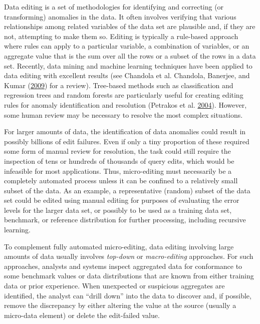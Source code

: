 \documentclass[]{krantz}
\begin{document}
Data editing is a set of methodologies for identifying and correcting
(or transforming) anomalies in the data. It often involves verifying
that various relationships among related variables of the data set are
plausible and, if they are not, attempting to make them so. Editing is
typically a rule-based approach where rules can apply to a particular
variable, a combination of variables, or an aggregate value that is the
sum over all the rows or a subset of the rows in a data set. Recently,
data mining and machine learning techniques have been applied to data
editing with excellent results (see Chandola et al. Chandola, Banerjee,
and Kumar (\protect\hyperlink{ref-chandola2009anomaly}{2009}) for a
review). Tree-based methods such as classification and regression trees
and random forests are particularly useful for creating editing rules
for anomaly identification and resolution (Petrakos et al.
\protect\hyperlink{ref-petrakos2004new}{2004}). However, some human
review may be necessary to resolve the most complex situations.

For larger amounts of data, the identification of data anomalies could
result in possibly billions of edit failures. Even if only a tiny
proportion of these required some form of manual review for resolution,
the task could still require the inspection of tens or hundreds of
thousands of query edits, which would be infeasible for most
applications. Thus, micro-editing must necessarily be a completely
automated process unless it can be confined to a relatively small subset
of the data. As an example, a representative (random) subset of the data
set could be edited using manual editing for purposes of evaluating the
error levels for the larger data set, or possibly to be used as a
training data set, benchmark, or reference distribution for further
processing, including recursive learning.

To complement fully automated micro-editing, data editing involving
large amounts of data usually involves \emph{top-down} or
\emph{macro-editing} approaches. For such approaches, analysts and
systems inspect aggregated data for conformance to some benchmark values
or data distributions that are known from either training data or prior
experience. When unexpected or suspicious aggregates are identified, the
analyst can ``drill down'' into the data to discover and, if possible,
remove the discrepancy by either altering the value at the source
(usually a micro-data element) or delete the edit-failed value.
\end{document}
